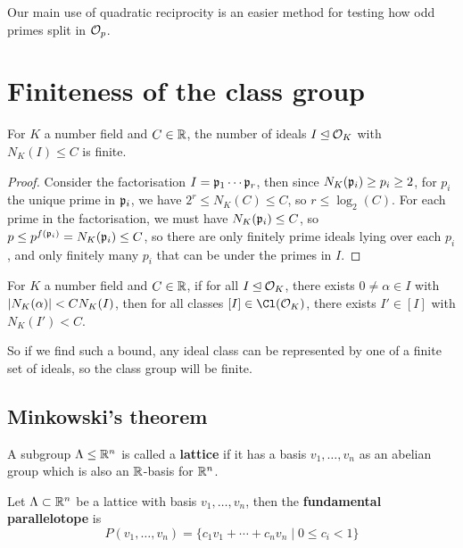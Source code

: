 \documentclass{article}
\begin{document}
Our main use of quadratic reciprocity is an easier method for testing how odd primes split in $\mathcal{O}_p$.

\section{Finiteness of the class group}

\begin{lemma}
    For $K$ a number field and $C\in \mathbb{R}$, the number of ideals $I\unlhd \mathcal{O}_K$ with $N_K(I)\leq C$ is finite.
    \begin{proof}
        Consider the factorisation $I=\mathfrak{p}_1\cdots\mathfrak{p}_r$, then since $N_K(\mathfrak{p}_i)\geq p_i\geq 2$, for $p_i$ the unique prime in $\mathfrak{p}_i$, we have $2^r\leq N_K(C)\leq C$, so $r\leq \log_2(C)$. For each prime in the factorisation, we must have $N_K(\mathfrak{p}_i)\leq C$, so $p\leq p^{f(\mathfrak{p}_i)} = N_K(\mathfrak{p}_i)\leq C$, so there are only finitely prime ideals lying over each $p_i$, and only finitely many $p_i$ that can be under the primes in $I$.
    \end{proof}
\end{lemma}

\begin{lemma}
    For $K$ a number field and $C\in \mathbb{R}$, if for all $I\unlhd \mathcal{O}_K$, there exists $0\neq \alpha\in I$ with $\left| N_K(\alpha) \right| < CN_K(I)$, then for all classes $[I]\in \Cl(\cO_K)$, there exists $I'\in [I]$ with $N_K(I') < C$.
\end{lemma}

So if we find such a bound, any ideal class can be represented by one of a finite set of ideals, so the class group will be finite.

\subsection{Minkowski's theorem}

\begin{definition}
    A subgroup $\Lambda\leq \mathbb{R}^n$ is called a \textbf{lattice} if it has a basis $v_1,\ldots,v_n$ as an abelian group which is also an $\mathbb{R}$-basis for $\mathbb{R}^n$.
\end{definition}

\begin{definition}
    Let $\Lambda\subset \mathbb{R}^n$ be a lattice with basis $v_1,\ldots,v_n$, then the \textbf{fundamental parallelotope} is \[
    P(v_1,\ldots,v_n) = \{c_1v_1 + \cdots + c_nv_n \mid 0\leq c_i < 1\}
    \]
\end{definition}
\end{document}
